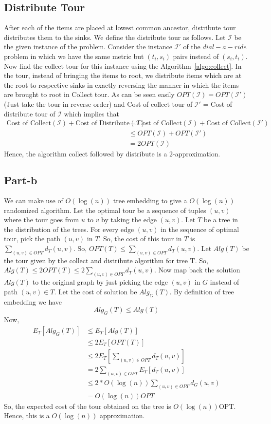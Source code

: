 \documentclass{article}
\begin{document}
\subsection{Distribute Tour}
After each of the items are placed at lowest common ancestor, distribute tour distributes them to the sinks. We define the distribute tour as follows. Let $\mathcal{I}$ be the given instance of the problem. Consider the instance $\mathcal{I'}$ of the $dial-a-ride$ problem in which we have the same metric but $(t_i,s_i)$ pairs instead of $(s_i,t_i)$. Now find the collect tour for this instance using the Algorithm~\ref{algo:collect}. In the tour, instead of bringing the items to root, we distribute items which are at the root to respective sinks in exactly reversing the manner in which the items are brought to root in Collect tour. As can be seen easily $OPT(\mathcal{I}) = OPT(\mathcal{I'})$(Just take the tour in reverse order) and Cost of collect tour of $\mathcal{I'}$ = Cost of distribute tour of $\mathcal{I}$ which implies that
\begin{align*}
    \text{Cost of Collect}(\mathcal{I}) + \text{Cost of Distribute}(\mathcal{I}) &= \text{Cost of Collect}(\mathcal{I}) + \text{Cost of Collect}(\mathcal{I'})\\
    &\leq OPT(\mathcal{I}) + OPT(\mathcal{I}')\\
    & = 2OPT(\mathcal{I})
\end{align*}
Hence, the algorithm collect followed by distribute is a 2-approximation.
\subsection{Part-b}
We can make use of $O(\log(n))$ tree embedding to give a $O(\log(n))$ randomized algorithm. Let the optimal tour be a sequence of tuples $(u,v)$ where the tour goes from $u$ to $v$ by taking the edge $(u,v)$. Let $T$ be a tree in the distribution of the trees. For every edge $(u,v)$ in the sequence of optimal tour, pick the path $(u,v)$ in $T$. So, the cost of this tour in $T$ is $\sum_{(u,v) \in OPT}d_T(u,v)$. So, $OPT(T) \leq \sum_{(u,v) \in OPT}d_T(u,v)$. Let $Alg(T)$ be the tour given by the collect and distribute algorithm for tree T. So, $Alg(T) \leq 2OPT(T) \leq 2\sum_{(u,v) \in OPT}d_T(u,v)$. Now map back the solution $Alg(T)$ to the original graph by just picking the edge $(u,v)$ in $G$ instead of path $(u,v) \in T$. Let the cost of solution be $Alg_G(T)$. By definition of tree embedding we have 
\begin{equation}
    Alg_G(T) \leq Alg(T)
\end{equation}
Now,
\begin{align*}
    E_T[Alg_G(T)] &\leq E_T[Alg(T)]\\
    &\leq 2E_T[OPT(T)]\\
    &\leq 2E_T[\sum_{(u,v)\in OPT}d_T(u,v)]\\
    & = 2\sum_{(u,v) \in OPT}E_T[d_T(u,v)]\\
    &\leq 2*O(\log(n))\sum_{(u,v)\in OPT}d_G(u,v)\\
    & = O(\log(n))OPT
\end{align*}
So, the expected cost of the tour obtained on the tree is $O(\log(n))$OPT. Hence, this is a $O(\log(n))$ approximation.
\end{document}
